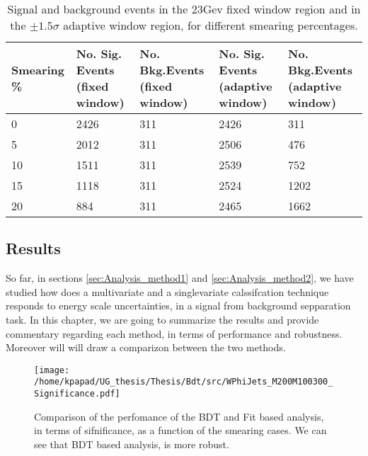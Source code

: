 \begin{table}[h!]
\centering
\begin{tabular}{|p{2cm}|p{3cm}|p{3cm}|p{3cm}|p{3cm}|}
 \hline
Smearing \%  & No. Sig. Events (fixed window) & No. Bkg.Events (fixed window) & No. Sig. Events (adaptive window) & No. Bkg.Events (adaptive window)  \\
\hline
0 & 2426 & 311 & 2426 & 311 \\
5 & 2012 & 311 & 2506 & 476 \\
10 & 1511 & 311 & 2539 & 752 \\
15 & 1118 & 311 & 2524 & 1202 \\
20 & 884 & 311 & 2465 & 1662 \\
 \hline
\end{tabular}
\caption{Signal and background events in the 23Gev fixed window region and in the $\pm 1.5\sigma$ adaptive window region, for different smearing percentages.}
\label{table:NumSigBkg}
\end{table}






\subsection{Results}
\label{sec:orge734935}
So far, in sections \ref{sec:Analysis_method1} and \ref{sec:Analysis_method2}, we have studied how does a multivariate and a singlevariate calssifcation technique responds to energy scale uncertainties, in a signal from background sepparation task. In this chapter, we are going to summarize the results and provide commentary regarding each method, in terms of performance and robustness. Moreover will will draw a comparizon between the two methods.

\begin{figure}[htbp]
\centering
\texttt{[image: /home/kpapad/UG\_thesis/Thesis/Bdt/src/WPhiJets\_M200M100300\_Significance.pdf]}
\caption{ Comparison of the perfomance of the BDT and Fit based analysis, in terms of sifnificance,  as a function of the smearing cases. We can see that BDT based analysis, is more robust.}
\label{fig:BdtFitSig}
\end{figure}

